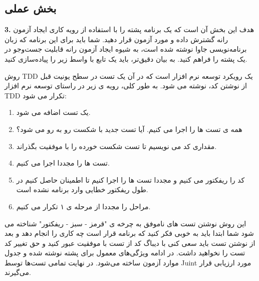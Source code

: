 \documentclass[twoside]{article}
\newenvironment{answer}{}{\medskip}
\newenvironment{question}[1]{\textbf{#1.} }{}
\begin{document}
\subsection*{بخش عملی}
\begin{question}{3}
هدف این بخش آن است که یک برنامه پشته را با استفاده از رویه کاری ایجاد آزمون رانه گشترش داده و مورد آزمون قرار دهید. شما باید برای این برنامه که زبان برنامه‌نویسی جاوا نوشته شده است، به شیوه ایجاد آزمون رانه قابلیت جست‌و‌جو در یک پشته را فراهم کنید. به بیان دقیق‌تر، باید یک تابع با واسط زیر را پیاده‌سازی کنید.

\end{question}
\begin{answer}
روش TDD یک رویکرد توسعه نرم افزار است که در آن یک تست در سطح یونیت قبل از نوشتن کد، نوشته می شود. به طور کلی، رویه ی زیر در راستای توسعه نرم افزار TDD تکرار می شود:
\begin{enumerate}
	\item
یک تست اضافه می شود.
	\item
همه ی تست ها را اجرا می کنیم. آیا تست جدید با شکست رو به رو می شود؟
	\item
مقداری کد می نویسیم تا تست شکست خورده را با موفقیت بگذراند.
	\item
تست ها را مجددا اجرا می کنیم.
	\item
کد را ریفکتور می کنیم و مجددا تست ها را اجرا کنیم تا اطمینان حاصل کنیم در طول ریفکتور خطایی وارد برنامه نشده است.
	\item
مراحل را مجددا از مرحله ی ۱ تکرار می کنیم.
\end{enumerate}
این روش نوشتن تست های ناموفق به چرخه ی "قرمز - سبز - ریفکتور" شناخته می شود شما ابتدا باید به خوبی فکر کنید که برنامه قرار است چه کاری را انجام دهد و بعد از نوشتن تست باید سعی کنی با دیباگ کد از تست با موفقیت عبور کنید و حق تغییر کد تست را نخواهید داشت. در ادامه ویژگی‌های معمول برای پشته نوشته شده و جدول موارد آزمون ساخته می‌شود. در نهایت تمامی تست‌ها توسط Juint مورد ارزیابی قرار می‌گیرند.


\end{answer}
\end{document}
